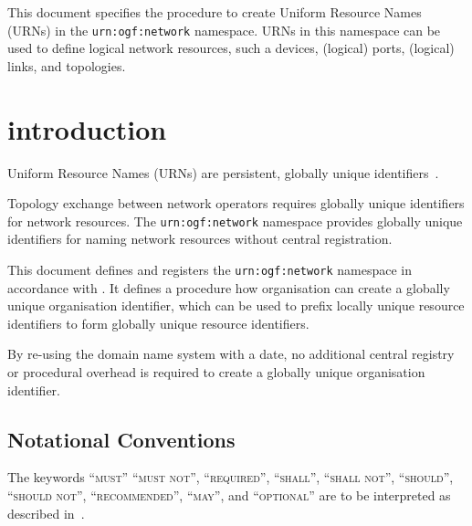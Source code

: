 \documentclass[12pt]{article}  %
\begin{document}
This document specifies the procedure to create Uniform Resource Names (URNs) in the \texttt{urn:ogf:network} namespace. URNs in this namespace can be used to define logical network resources, such a devices, (logical) ports, (logical) links, and topologies.

\tableofcontents

\newpage

\section{introduction}%
\label{sec:introduction}

Uniform Resource Names (URNs) are persistent, globally unique identifiers~\cite{rfc2141}.

Topology exchange between network operators requires globally unique identifiers for network resources.  The \texttt{urn:ogf:network} namespace provides globally unique identifiers for naming network resources without central registration.

This document defines and registers the \texttt{urn:ogf:network} namespace in accordance with \cite{urn-ogf-procedure}.  It defines a procedure how organisation can create a globally unique organisation identifier, which can be used to prefix locally unique resource identifiers to form globally unique resource identifiers.

By re-using the domain name system with a date, no additional central registry or procedural overhead is required to create a globally unique organisation identifier.


\subsection*{Notational Conventions}
\label{sec:rfc2119}

\newcommand{\MUST}{\textsc{must}}
\newcommand{\MUSTNOT}{\textsc{must not}}
\newcommand{\REQUIRED}{\textsc{required}}
\newcommand{\SHALL}{\textsc{shall}}
\newcommand{\SHALLNOT}{\textsc{shall not}}
\newcommand{\SHOULD}{\textsc{should}}
\newcommand{\SHOULDNOT}{\textsc{should not}}
\newcommand{\RECOMMENDED}{\textsc{recommended}}
\newcommand{\NOTRECOMMENDED}{\textsc{not recommended}}
\newcommand{\MAY}{\textsc{may}}
\newcommand{\OPTIONAL}{\textsc{optional}}

The keywords “\MUST{}” “\MUSTNOT{}”, “\REQUIRED{}”, “\SHALL{}”, “\SHALLNOT{}”, “\SHOULD{}”, “\SHOULDNOT{}”, “\RECOMMENDED{}”, “\MAY{}”,  and “\OPTIONAL{}” are to be interpreted as described in~\cite{rfc2119}.
\end{document}
